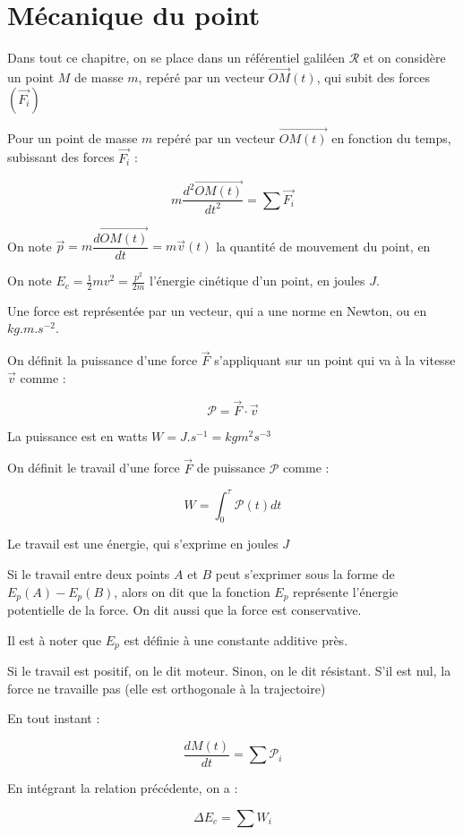 \documentclass[a4paper,12pt]{book}
\newcommand{\Def}[2]{\begin{tcolorbox}[colback=white,colframe=red!10!green!20!blue!75!, title=Définition : #1]#2\end{tcolorbox}}
\newcommand{\Thr}[2]{\begin{tcolorbox}[sharp corners, colback=white,colframe=red!10!blue!30!green!75!, title=Théorème : #1]#2\end{tcolorbox}}
\renewcommand{\Vec}[1]{\overrightarrow{#1}}
\begin{document}
\section{Mécanique du point}
Dans tout ce chapitre, on se place dans un référentiel galiléen $\mathcal{R}$ et on considère un point $M$ de masse $m$, repéré par un vecteur $\Vec{OM}(t)$, qui subit des forces $(\Vec{F_i})$
\Thr{RFD}{Pour un point de masse $m$ repéré par un vecteur $\Vec{OM(t)}$ en fonction du temps, subissant des forces $\Vec{F_i}$ :
\par $$m\dfrac{d^2\Vec{OM(t)}}{dt^2} = \sum\Vec{F_i}$$
\par On note $\Vec{p} = m\dfrac{d\Vec{OM(t)}}{dt} = m\Vec{v}(t)$ la quantité de mouvement du point, en 
\par On note $E_c=\frac{1}{2}mv^2 =\frac{p^2}{2m}$ l'énergie cinétique d'un point, en joules $J$.}
\Def{Grandeurs relatives à une force}{Une force est représentée par un vecteur, qui a une norme en Newton, ou en $kg.m.s^{-2}$.
\par On définit la puissance d'une force $\Vec{F}$ s'appliquant sur un point qui va à la vitesse $\Vec{v}$ comme :
\par $$\mathcal{P}=\Vec{F}\cdot\Vec{v}$$
\par La puissance est en watts $W=J.s^{-1} = kgm^2s^{-3}$
\par On définit le travail d'une force $\Vec{F}$ de puissance $\mathcal{P}$ comme :
\par $$W = \int_0^\tau\mathcal{P}(t)dt$$
\par Le travail est une énergie, qui s'exprime en joules $J$
\par Si le travail entre deux points $A$ et $B$ peut s'exprimer sous la forme de $E_p(A)-E_p(B)$, alors on dit que la fonction $E_p$ représente l'énergie potentielle de la force. On dit aussi que la force est conservative.
\par Il est à noter que $E_p$ est définie à une constante additive près.
\par Si le travail est positif, on le dit moteur. Sinon, on le dit résistant. S'il est nul, la force ne travaille pas (elle est orthogonale à la trajectoire)}
\Thr{Théorème de la puissance mécanique TPM}{En tout instant :
\par $$\dfrac{d M(t)}{dt} = \sum \mathcal{P}_i$$}
\Thr{Théorème de l'énergie cinétique TEC}{En intégrant la relation précédente, on a :
\par $$\Delta E_c = \sum W_i$$}
\end{document}
